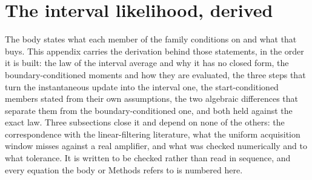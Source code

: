 \begin{appendixbox}
\label{app:derivation}
\section*{The interval likelihood, derived}

The body states what each member of the family conditions on and what that buys. This
appendix carries the derivation behind those statements, in the order it is built: the law of the
interval average and why it has no closed form, the boundary-conditioned moments and how they are
evaluated, the three steps that turn the instantaneous update into the interval one, the
start-conditioned members stated from their own assumptions, the two algebraic differences that
separate them from the boundary-conditioned one, and both held against the exact law. Three
subsections close it and depend on none of the others: the correspondence with the
linear-filtering literature, what the uniform acquisition window misses against a real amplifier,
and what was checked numerically and to what tolerance. It is written to be checked rather
than read in sequence, and every equation the body or Methods refers to is numbered here.


\end{appendixbox}
